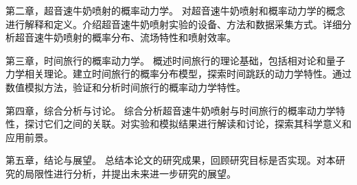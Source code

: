 第二章，超音速牛奶喷射的概率动力学。
对超音速牛奶喷射和概率动力学的概念进行解释和定义。介绍超音速牛奶喷射实验的设备、方法和数据采集方式。详细分析超音速牛奶喷射的概率分布、流场特性和喷射效率。

第三章，时间旅行的概率动力学。
概述时间旅行的理论基础，包括相对论和量子力学相关理论。建立时间旅行的概率分布模型，探索时间跳跃的动力学特性。通过数值模拟方法，验证和分析时间旅行的概率动力学特性。

第四章，综合分析与讨论。
综合分析超音速牛奶喷射与时间旅行的概率动力学特性，探讨它们之间的关联。对实验和模拟结果进行解读和讨论，探索其科学意义和应用前景。

第五章，结论与展望。
总结本论文的研究成果，回顾研究目标是否实现。对本研究的局限性进行分析，并提出未来进一步研究的展望。
